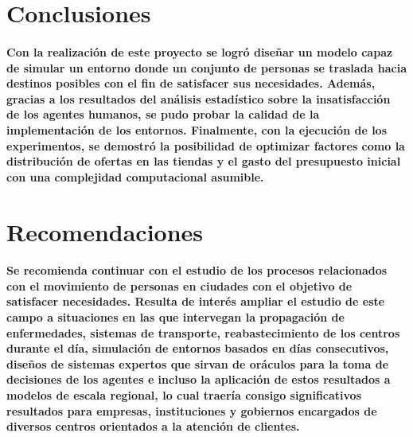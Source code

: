 \documentclass[12pt]{amsart}
\begin{document}
\section{Conclusiones}

\paragraph{Con la realización de este proyecto se logró diseñar un modelo capaz de simular un entorno donde un conjunto de personas se traslada hacia destinos posibles con el fin de satisfacer sus necesidades. Además, gracias a los resultados del análisis estadístico sobre la insatisfacción de los agentes humanos, se pudo probar la calidad de la implementación de los entornos. Finalmente, con la ejecución de los experimentos, se demostró la posibilidad de optimizar factores como la distribución de ofertas en las tiendas y el gasto del presupuesto inicial con una complejidad computacional asumible.}

\section{Recomendaciones}

\paragraph{Se recomienda continuar con el estudio de los procesos relacionados con el movimiento de personas en ciudades con el objetivo de satisfacer necesidades. Resulta de interés ampliar el estudio de este campo a situaciones en las que intervegan la propagación de enfermedades, sistemas de transporte, reabastecimiento de los centros durante el día, simulación de entornos basados en días consecutivos, diseños de sistemas expertos que sirvan de oráculos para la toma de decisiones de los agentes e incluso la aplicación de estos resultados a modelos de escala regional, lo cual traería consigo significativos resultados para empresas, instituciones y gobiernos encargados de diversos centros orientados a la atención de clientes.}
\end{document}
